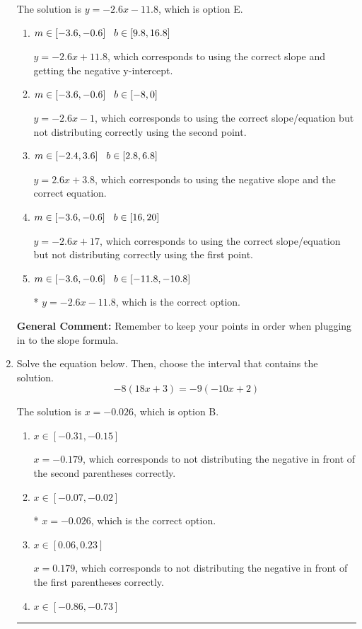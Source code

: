 \documentclass{extbook}[14pt]
\newcommand{\litem}[1]{\item #1

\rule{\textwidth}{0.4pt}}
\begin{document}
\begin{enumerate}
{The solution is \( y = -2.6x -11.8 \), which is option E.\begin{enumerate}[label=\Alph*.]
\item \( m \in [-3.6, -0.6] \hspace*{3mm} b \in [9.8, 16.8] \)

 $y = -2.6x + 11.8$, which corresponds to using the correct slope and getting the negative y-intercept.
\item \( m \in [-3.6, -0.6] \hspace*{3mm} b \in [-8, 0] \)

 $y = -2.6x -1$, which corresponds to using the correct slope/equation but not distributing correctly using the second point.
\item \( m \in [-2.4, 3.6] \hspace*{3mm} b \in [2.8, 6.8] \)

 $y = 2.6x + 3.8$, which corresponds to using the negative slope and the correct equation.
\item \( m \in [-3.6, -0.6] \hspace*{3mm} b \in [16, 20] \)

 $y = -2.6x + 17$, which corresponds to using the correct slope/equation but not distributing correctly using the first point.
\item \( m \in [-3.6, -0.6] \hspace*{3mm} b \in [-11.8, -10.8] \)

* $y = -2.6x -11.8$, which is the correct option.
\end{enumerate}

\textbf{General Comment:} Remember to keep your points in order when plugging in to the slope formula.
}
\litem{
Solve the equation below. Then, choose the interval that contains the solution.
\[ -8(18x + 3) = -9(-10x + 2) \]

The solution is \( x = -0.026 \), which is option B.\begin{enumerate}[label=\Alph*.]
\item \( x \in [-0.31, -0.15] \)

$x = -0.179$, which corresponds to not distributing the negative in front of the second parentheses correctly.
\item \( x \in [-0.07, -0.02] \)

* $x = -0.026$, which is the correct option.
\item \( x \in [0.06, 0.23] \)

$x = 0.179$, which corresponds to not distributing the negative in front of the first parentheses correctly.
\item \( x \in [-0.86, -0.73] \)


\end{enumerate}}
\end{enumerate}
\end{document}
